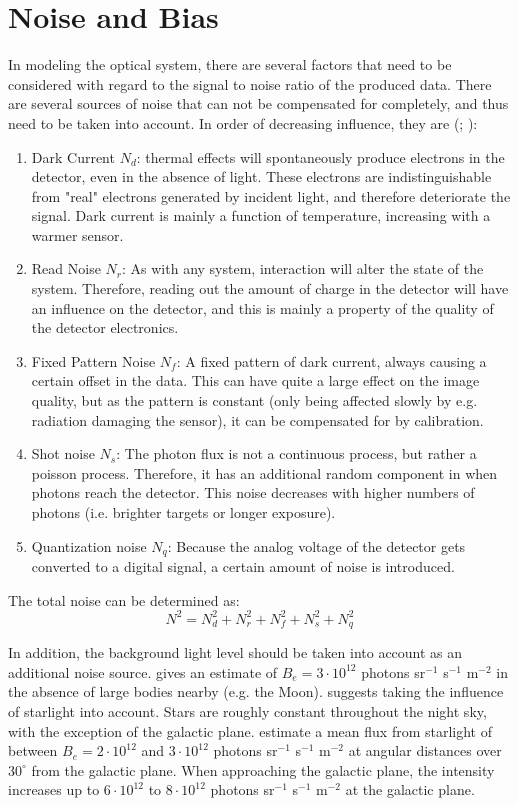 \section{Noise and Bias}
\label{sec:opticalnoise}
In modeling the optical system, there are several factors that need to be considered with regard to the signal to noise ratio of the produced data. There are several sources of noise that can not be compensated for completely, and thus need to be taken into account. In order of decreasing influence, they are (\cite{OpNav}; \cite{SMAD}):
\begin{enumerate}
    \item Dark Current $N_d$: thermal effects will spontaneously produce electrons in the detector, even in the absence of light. These electrons are indistinguishable from "real" electrons generated by incident light, and therefore deteriorate the signal. Dark current is mainly a function of temperature, increasing with a warmer sensor.
    \item Read Noise $N_r$: As with any system, interaction will alter the state of the system. Therefore, reading out the amount of charge in the detector will have an influence on the detector, and this is mainly a property of the quality of the detector electronics.
    \item Fixed Pattern Noise $N_f$: A fixed pattern of dark current, always causing a certain offset in the data. This can have quite a large effect on the image quality, but as the pattern is constant (only being affected slowly by e.g. radiation damaging the sensor), it can be compensated for by calibration.
    \item Shot noise $N_s$: The photon flux is not a continuous process, but rather a poisson process. Therefore, it has an additional random component in when photons reach the detector. This noise decreases with higher numbers of photons (i.e. brighter targets or longer exposure).
    \item Quantization noise $N_q$: Because the analog voltage of the detector gets converted to a digital signal, a certain amount of noise is introduced. 
\end{enumerate}
The total noise can be determined as:
\begin{equation}
    N^2 = N_d^2 + N_r^2 + N_f^2 + N_s^2 + N_q^2
    \label{eq:noisecombined}
\end{equation}

In addition, the background light level should be taken into account as an additional noise source. \cite{nightsky} gives an estimate of $B_e = 3\cdot 10^{12}$ photons sr$^{-1}$ s$^{-1}$ m$^{-2}$ in the absence of large bodies nearby (e.g. the Moon). \cite{thesisspacebased} suggests taking the influence of starlight into account. Stars are roughly constant throughout the night sky, with the exception of the galactic plane. \cite{starlight} estimate a mean flux from starlight of between $B_e = 2\cdot 10^{12}$ and $ 3\cdot 10^{12}$ photons sr$^{-1}$ s$^{-1}$ m$^{-2}$ at angular distances over $30^\circ$ from the galactic plane. When approaching the galactic plane, the intensity increases up to $6 \cdot 10^{12}$ to $8 \cdot 10^{12}$ photons sr$^{-1}$ s$^{-1}$ m$^{-2}$ at the galactic plane. 

